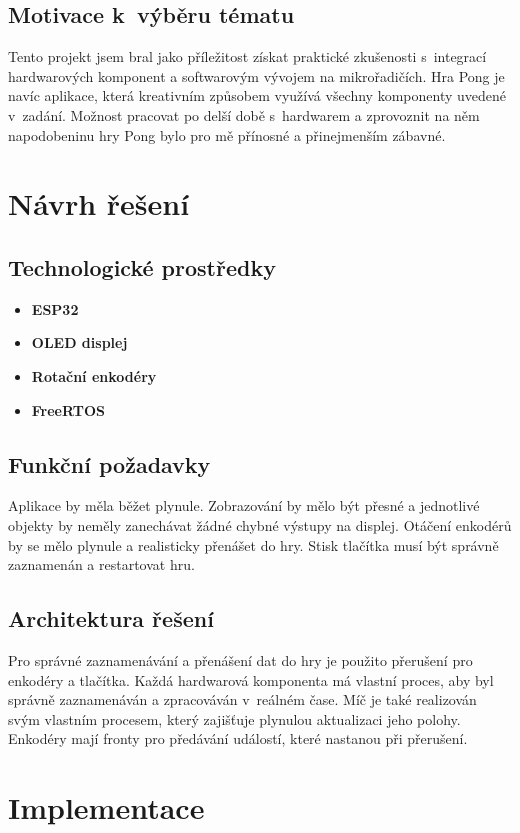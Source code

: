 \documentclass[a4paper,11pt]{article}
\begin{document}
\subsection{Motivace k~výběru tématu}
Tento projekt jsem bral jako příležitost získat praktické zkušenosti s~integrací hardwarových komponent a softwarovým vývojem na mikrořadičích. 
Hra Pong je navíc aplikace, která kreativním způsobem využívá všechny komponenty uvedené v~zadání. 
Možnost pracovat po delší době s~hardwarem a zprovoznit na něm napodobeninu hry Pong bylo pro mě přínosné a přinejmenším zábavné. 

\section{Návrh řešení}
\subsection{Technologické prostředky}
\begin{itemize}
    \item \textbf{ESP32}
    \item \textbf{OLED displej}
    \item \textbf{Rotační enkodéry}
    \item \textbf{FreeRTOS}
\end{itemize}

\subsection{Funkční požadavky}
Aplikace by měla běžet plynule. 
Zobrazování by mělo být přesné a jednotlivé objekty by neměly zanechávat žádné chybné výstupy na displej.
Otáčení enkodérů by se mělo plynule a realisticky přenášet do hry.
Stisk tlačítka musí být správně zaznamenán a restartovat hru.

\subsection{Architektura řešení}
Pro správné zaznamenávání a přenášení dat do hry je použito přerušení pro enkodéry a tlačítka.
Každá hardwarová komponenta má vlastní proces, aby byl správně zaznamenáván a zpracováván v~reálném čase.
Míč je také realizován svým vlastním procesem, který zajišťuje plynulou aktualizaci jeho polohy.
Enkodéry mají fronty pro předávání událostí, které nastanou při přerušení.

\section{Implementace}
\end{document}
